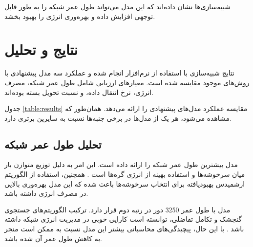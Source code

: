 \documentclass[12pt, onecolumn, a4paper]{article}
\begin{document}
شبیه‌سازی‌ها نشان داده‌اند که این مدل می‌تواند طول عمر شبکه را به طور قابل توجهی افزایش داده و بهره‌وری انرژی را بهبود بخشد.

\section{نتایج و تحلیل}

نتایج شبیه‌سازی با استفاده از نرم‌افزار  انجام شده و عملکرد سه مدل پیشنهادی با روش‌های موجود مقایسه شده است. معیارهای ارزیابی شامل طول عمر شبکه، مصرف انرژی، نرخ انتقال داده، و نسبت تحویل بسته بوده‌اند. 

جدول \ref{table:results} مقایسه عملکرد مدل‌های پیشنهادی را ارائه می‌دهد. همان‌طور که مشاهده می‌شود، هر یک از مدل‌ها در برخی جنبه‌ها نسبت به سایرین برتری دارد. 

\begin{table}[h!]
	\centering
	\caption{مقایسه عملکرد مدل‌های پیشنهادی}
	\label{table:results}
\end{table}

\subsection*{تحلیل طول عمر شبکه}
مدل  بیشترین طول عمر شبکه را ارائه داده است. این امر به دلیل توزیع متوازن بار میان سرخوشه‌ها و استفاده بهینه از انرژی گره‌ها است \cite{ref4, ref5}. همچنین، استفاده از الگوریتم ارشمیدس بهبودیافته برای انتخاب سرخوشه‌ها باعث شده که این مدل بهره‌وری بالایی در مصرف انرژی داشته باشد. 

مدل  با طول عمر 3250 دور در رتبه دوم قرار دارد. ترکیب الگوریتم‌های جستجوی گنجشک و تکامل تفاضلی، توانسته است کارایی خوبی در مدیریت انرژی شبکه داشته باشد \cite{ref6}. با این حال، پیچیدگی‌های محاسباتی بیشتر این مدل نسبت به  ممکن است منجر به کاهش طول عمر آن شده باشد.
\end{document}
